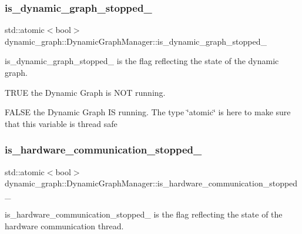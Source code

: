\subsubsection{\texorpdfstring{is\+\_\+dynamic\+\_\+graph\+\_\+stopped\+\_\+}{is\_dynamic\_graph\_stopped\_}}
{\footnotesize\ttfamily std\+::atomic$<$bool$>$ dynamic\+\_\+graph\+::\+Dynamic\+Graph\+Manager\+::is\+\_\+dynamic\+\_\+graph\+\_\+stopped\+\_\+\hspace{0.3cm}{\ttfamily [protected]}}



is\+\_\+dynamic\+\_\+graph\+\_\+stopped\+\_\+ is the flag reflecting the state of the dynamic graph. 


\begin{DoxyItemize}
\item T\+R\+UE the Dynamic Graph is N\+OT running.
\item F\+A\+L\+SE the Dynamic Graph IS running. The type \char`\"{}atomic\char`\"{} is here to make sure that this variable is thread safe 
\end{DoxyItemize}\mbox{\label{classdynamic__graph_1_1DynamicGraphManager_ab1a2bc0a8f04126638056f430297097e}} 
\subsubsection{\texorpdfstring{is\+\_\+hardware\+\_\+communication\+\_\+stopped\+\_\+}{is\_hardware\_communication\_stopped\_}}
{\footnotesize\ttfamily std\+::atomic$<$bool$>$ dynamic\+\_\+graph\+::\+Dynamic\+Graph\+Manager\+::is\+\_\+hardware\+\_\+communication\+\_\+stopped\+\_\+\hspace{0.3cm}{\ttfamily [protected]}}



is\+\_\+hardware\+\_\+communication\+\_\+stopped\+\_\+ is the flag reflecting the state of the hardware communication thread. 


